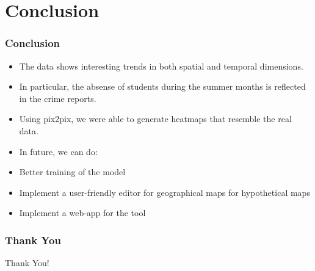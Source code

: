 \documentclass{beamer}
\begin{document}
\section{Conclusion}
\begin{frame}
    \frametitle{Conclusion}
    \begin{itemize}
        \item The data shows interesting trends in both spatial and temporal dimensions.
        \item In particular, the absense of students during the summer months is reflected in the crime reports.
        \item Using pix2pix, we were able to generate heatmaps that resemble the real data.
        \item In future, we can do:
        \item \quad Better training of the model
        \item \quad Implement a user-friendly editor for geographical maps for hypothetical maps
        \item \quad Implement a web-app for the tool
    \end{itemize}
\end{frame}

\begin{frame}
    \frametitle{Thank You}
    \centering
    \Huge Thank You!
\end{frame}
\end{document}
